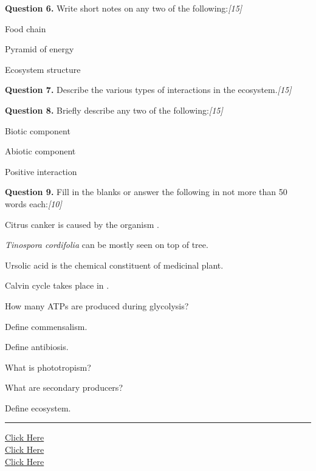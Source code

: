 \documentclass[11pt,a4paper]{article}
\newcommand{\pts}[1]{\hfill   \textit{[#1]}}
\begin{document}
\medskip


\noindent   \textbf{Question 6.} Write short notes on any two of the following:\pts{15}

\begin{parts}
  \item Food chain
  \item Pyramid of energy
  \item Ecosystem structure
\end{parts}

\medskip


\noindent   \textbf{Question 7.} Describe the various types of interactions in the ecosystem.\pts{15}

\medskip


\noindent   \textbf{Question 8.} Briefly describe any two of the following:\pts{15}

\begin{parts}
  \item Biotic component
  \item Abiotic component
  \item Positive interaction
\end{parts}

\medskip


\noindent   \textbf{Question 9.} Fill in the blanks or answer the following in not more than 50 words each:\pts{10}

\begin{parts}
  \item Citrus canker is caused by the organism \makebox[3cm]{\hrulefill}.
  \item   \textit{Tinospora cordifolia} can be mostly seen on top of \makebox[3cm]{\hrulefill} tree.
  \item Ursolic acid is the chemical constituent of \makebox[3cm]{\hrulefill} medicinal plant.
  \item Calvin cycle takes place in \makebox[3cm]{\hrulefill}.
  \item How many ATPs are produced during glycolysis?
  \item Define commensalism.
  \item Define antibiosis.
  \item What is phototropism?
  \item What are secondary producers?
  \item Define ecosystem.
\end{parts}

\vfill
\rule{\linewidth}{0.4pt}

\begin{center}\small
\href{https://bhu-exam.vercel.app/}{Click Here}\\[4pt]\href{https://me-aryan.vercel.app/}{Click Here}\\[4pt]\href{https://quashan-me.vercel.app/}{Click Here}
\end{center}
\end{document}
